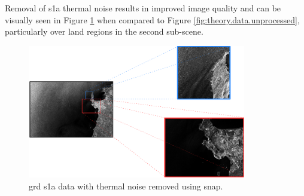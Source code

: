 

Removal of \acs{s1a} thermal noise results in improved image quality and can be visually seen in Figure \ref{fig:theory.data.thermalNoiseRemoval} when compared to Figure \ref{fig:theory.data.unprocessed}, particularly over land regions in the second sub-scene.

\begin{figure}[htbp]
    \centering
    \includegraphics[width=0.85\textwidth]{Figures/Theory/thermalNoiseCalibratedSARData.pdf}
    \caption{\acs{grd} \acs{s1a} data with thermal noise removed using \acs{snap}.}
    \label{fig:theory.data.thermalNoiseRemoval}
\end{figure}

